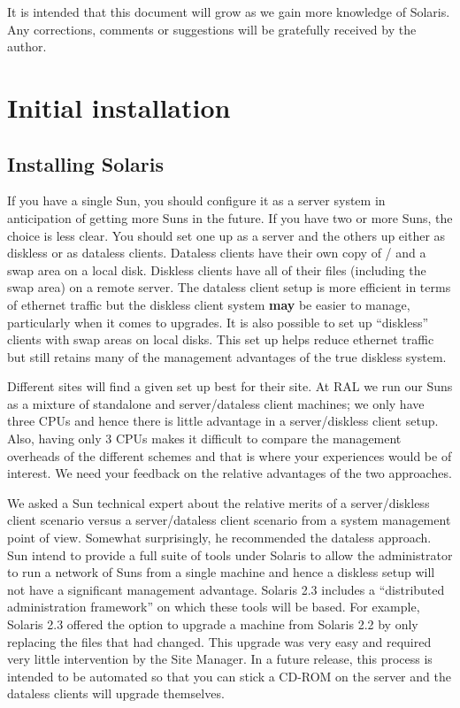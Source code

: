 It is intended that this document will grow as we gain more knowledge
of Solaris. Any corrections, comments or suggestions will be
gratefully received by the author.


\section{Initial installation}

\subsection{Installing Solaris}

If you have a single Sun, you should configure it as a server system in
anticipation of getting more Suns in the future. If you have two
or more Suns, the choice is less clear. You should set one up as a
server and the others up either as diskless or as dataless clients.
Dataless clients have their own copy of / and a swap area on a local disk.
Diskless clients have all of their files (including the swap area) on a
remote server. The dataless client setup is more efficient in terms of
ethernet traffic but the diskless client system {\bf may} be easier to manage,
particularly when it comes to upgrades. It is also possible to set up
``diskless'' clients with swap areas on local disks. This set up helps
reduce ethernet traffic but still retains many of the management
advantages of the true diskless system.

Different sites will find a given set up best for their site.
At RAL we run our Suns as a mixture of standalone and server/dataless client
machines; we only have three CPUs and hence there is little advantage in
a server/diskless client setup. Also, having only 3 CPUs makes it difficult to
compare the management overheads of the different schemes and that is where
your experiences would be of interest. We need your feedback on the
relative advantages of the two approaches.

We asked a Sun technical expert about the relative merits of a
server/diskless client scenario versus a server/dataless client scenario
from a system management point of view. Somewhat surprisingly, he
recommended the dataless approach. Sun intend to provide a full suite
of tools under Solaris to allow the administrator to run a network of
Suns from a single machine and hence a diskless setup will not have a
significant management advantage. Solaris 2.3 includes a ``distributed
administration framework'' on which these tools will be based.  For
example, Solaris 2.3 offered the option to upgrade a machine from
Solaris 2.2 by only replacing the files that had changed. This upgrade was
very easy and required very little intervention by the Site Manager.
In a future
release, this process is intended to be automated so that you can stick
a CD-ROM on the server and the dataless clients will upgrade
themselves.

